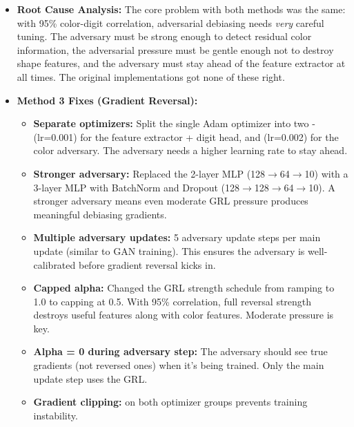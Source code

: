 \documentclass[9pt,a4paper,twocolumn,twoside]{tau-class/tau}
\begin{document}
        \begin{itemize}
            \item \textbf{Root Cause Analysis:} The core problem with both methods was the same: with 95\% color-digit correlation, adversarial debiasing needs \textit{very} careful tuning. The adversary must be strong enough to detect residual color information, the adversarial pressure must be gentle enough not to destroy shape features, and the adversary must stay ahead of the feature extractor at all times. The original implementations got none of these right.

            \item \textbf{Method 3 Fixes (Gradient Reversal):}
            \begin{itemize}
                \item \textbf{Separate optimizers:} Split the single Adam optimizer into two -  (lr=0.001) for the feature extractor + digit head, and  (lr=0.002) for the color adversary. The adversary needs a higher learning rate to stay ahead.
                \item \textbf{Stronger adversary:} Replaced the 2-layer MLP (128$\rightarrow$64$\rightarrow$10) with a 3-layer MLP with BatchNorm and Dropout (128$\rightarrow$128$\rightarrow$64$\rightarrow$10). A stronger adversary means even moderate GRL pressure produces meaningful debiasing gradients.
                \item \textbf{Multiple adversary updates:} 5 adversary update steps per main update (similar to GAN training). This ensures the adversary is well-calibrated before gradient reversal kicks in.
                \item \textbf{Capped alpha:} Changed the GRL strength schedule from ramping to 1.0 to capping at 0.5. With 95\% correlation, full reversal strength destroys useful features along with color features. Moderate pressure is key.
                \item \textbf{Alpha = 0 during adversary step:} The adversary should see true gradients (not reversed ones) when it's being trained. Only the main update step uses the GRL.
                \item \textbf{Gradient clipping:}  on both optimizer groups prevents training instability.
            \end{itemize}


\end{itemize}
\end{document}
